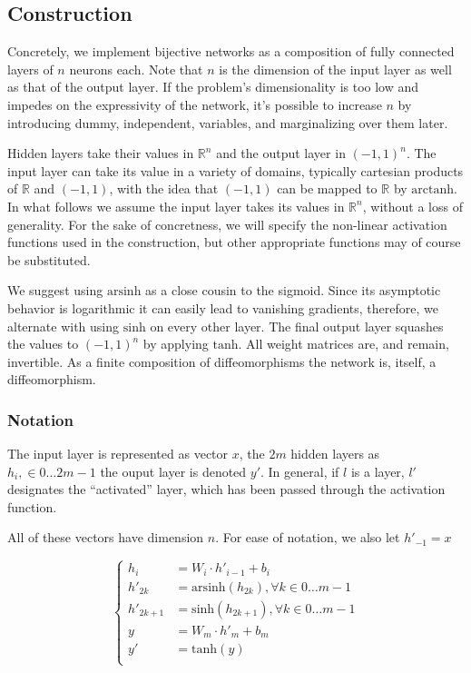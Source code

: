 \documentclass{article}
\begin{document}
\subsection{Construction}

Concretely, we implement bijective networks as a composition of fully
connected layers of \(n\) neurons each. Note that \(n\) is the dimension of
the input layer as well as that of the output layer. If the problem's
dimensionality is too low and impedes on the expressivity of the network,
it's possible to increase \(n\) by introducing dummy, independent, variables,
and marginalizing over them later.

Hidden layers take their values in \(\mathbb{R}^n\) and the output layer in
\((-1,1)^n\). The input layer can take its value in a variety of domains,
typically cartesian products of \(\mathbb{R}\) and \((-1,1)\), with the idea
that \((-1, 1)\) can be mapped to \(\mathbb{R}\) by \(\mathrm{arctanh}\).
In what follows we assume the input layer takes its values in \(\mathbb{R}^n\),
without a loss of generality. For the sake of concretness, we will specify the
non-linear activation functions used in the construction, but other appropriate
functions may of course be substituted.

We suggest using \(\mathrm{arsinh}\) as a close cousin to the sigmoid. Since
its asymptotic behavior is logarithmic it can easily lead to vanishing
gradients, therefore, we alternate with using \(\mathrm{sinh}\) on every other
layer. The final output layer squashes the values to \((-1,1)^n\) by applying
\(\mathrm{tanh}\). All weight matrices are, and remain, invertible. As a
finite composition of diffeomorphisms the network is, itself, a
diffeomorphism.

\subsubsection{Notation}

The input layer is represented as vector \(x\), the \(2m\) hidden layers as
\(h_i, \in 0 \ldots 2m-1 \) the ouput layer is denoted \(y'\). In general,
if \(l\) is a layer, \(l'\) designates the ``activated'' layer, which has been
passed through the activation function.

All of these vectors have dimension \(n\). For ease of notation, we also let
\(h'_{-1} = x\)

\[
  \left\{
    \begin{aligned}
      h_{i} &= W_{i} \cdot  h'_{i-1} + b_{i} \\
      h'_{2k} &= \mathrm{arsinh}(h_{2k}), \forall k \in 0 \ldots m-1 \\
      h'_{2k+1} &= \mathrm{sinh}(h_{2k+1}), \forall k \in 0 \ldots m-1\\
      y &= W_{m} \cdot h'_m + b_m  \\
      y' &= \mathrm{tanh}(y) \\
    \end{aligned}
  \right.
\]
\end{document}
